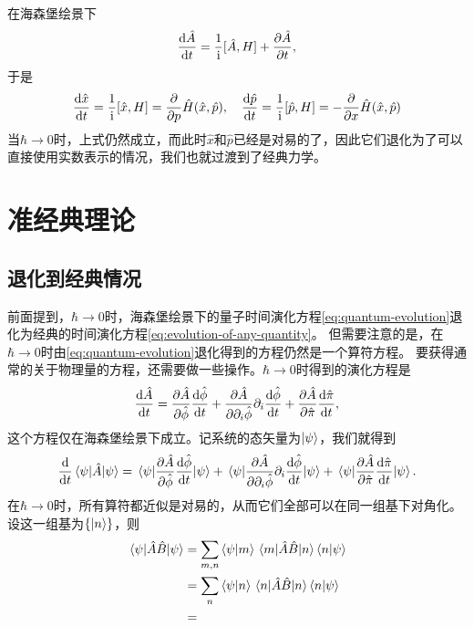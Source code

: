 \documentclass[UTF8, a4paper]{ctexart}
\newcommand*{\ii}{\mathrm{i}}
\begin{document}
在海森堡绘景下
\[
    \dv{\hat{A}}{t} = \frac{1}{\ii} [\hat{A}, H] + \pdv{\hat{A}}{t},
\]
于是
\[
    \dv{\hat{x}}{t} = \frac{1}{\ii} [\hat{x}, H] = \pdv{p} \hat{H}(\hat{x}, \hat{p}), \quad
    \dv{\hat{p}}{t} = \frac{1}{\ii} [\hat{p}, H] = -\pdv{x} \hat{H}(\hat{x}, \hat{p})
\]
当$\hbar \to 0$时，上式仍然成立，而此时$\hat{x}$和$\hat{p}$已经是对易的了，因此它们退化为了可以直接使用实数表示的情况，我们也就过渡到了经典力学。

\section{准经典理论}

\subsection{退化到经典情况}\label{sec:back-to-classical}

前面提到，$\hbar \to 0$时，海森堡绘景下的量子时间演化方程\eqref{eq:quantum-evolution}退化为经典的时间演化方程\eqref{eq:evolution-of-any-quantity}。
但需要注意的是，在$\hbar\to 0$时由\eqref{eq:quantum-evolution}退化得到的方程仍然是一个算符方程。
要获得通常的关于物理量的方程，还需要做一些操作。$\hbar\to 0$时得到的演化方程是
\[
    \dv{\hat{A}}{t} = \pdv{\hat{A}}{\hat{\phi}} \dv{\hat{\phi}}{t} + \pdv{\hat{A}}{\partial_i \hat{\phi}} \partial_i \dv{\hat{\phi}}{t} + \pdv{\hat{A}}{\hat{\pi}} \dv{\hat{\pi}}{t},
\]
这个方程仅在海森堡绘景下成立。记系统的态矢量为$\ket{\psi}$，我们就得到
\[
    \dv{t} \mel{\psi}{\hat{A}}{\psi} =  \mel{\psi}{\pdv{\hat{A}}{\hat{\phi}} \dv{\hat{\phi}}{t}}{\psi} + \mel{\psi}{\pdv{\hat{A}}{\partial_i \hat{\phi}} \partial_i \dv{\hat{\phi}}{t}}{\psi} + \mel{\psi}{\pdv{\hat{A}}{\hat{\pi}} \dv{\hat{\pi}}{t}}{\psi}.
\]
在$\hbar\to 0$时，所有算符都近似是对易的，从而它们全部可以在同一组基下对角化。设这一组基为$\{\ket{n}\}$，则
\[
    \begin{aligned}
        \mel{\psi}{\hat{A}\hat{B}}{\psi} &= \sum_{m,n} \braket{\psi}{m} \mel{m}{\hat{A}\hat{B}}{n} \braket{n}{\psi} \\
        &= \sum_{n} \braket{\psi}{n} \mel{n}{\hat{A}\hat{B}}{n} \braket{n}{\psi} \\
        &= 
    \end{aligned}
\]
\end{document}
